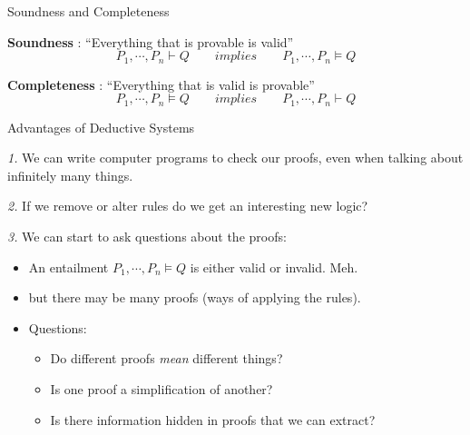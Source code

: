 \documentclass[xetex,aspectratio=169,14pt,hyperref={pdfpagelabels=true,pdflang={en-GB}}]{beamer}
\begin{document}
\begin{frame}
  {Soundness and Completeness}

  \textbf{Soundness} : ``Everything that is provable is valid''
  \begin{displaymath}
    P_1, \cdots, P_n \vdash Q \qquad \textit{implies} \qquad P_1, \cdots, P_n \models Q
  \end{displaymath}

  \bigskip

  \textbf{Completeness} : ``Everything that is valid is provable''
  \begin{displaymath}
    P_1, \cdots, P_n \models Q \qquad \textit{implies} \qquad P_1, \cdots, P_n \vdash Q
  \end{displaymath}

\end{frame}

\begin{frame}
  {Advantages of Deductive Systems}

  \bigskip \emph{1. } We can write computer programs to check our proofs, even
  when talking about infinitely many things.

  \pause
  \bigskip
  \emph{2. }If we remove or alter rules do we get an interesting new logic?

  \pause
  \bigskip
  \emph{3. }We can start to ask questions about the proofs:
  \begin{itemize}
  \item An entailment $P_1, \cdots, P_n \models Q$ is either valid or invalid. Meh.
  \item but there may be many proofs (ways of applying the rules).
  \item Questions:
    \begin{itemize}
    \item Do different proofs \emph{mean} different things?
    \item Is one proof a simplification of another?
    \item Is there information hidden in proofs that we can extract?
    \end{itemize}
  \end{itemize}
\end{frame}
\end{document}
